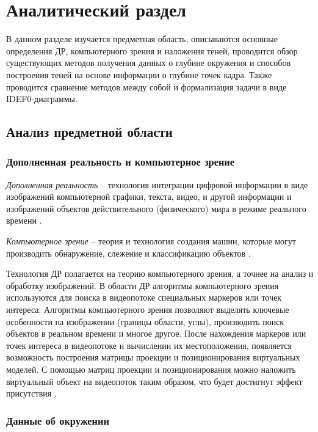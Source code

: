 \chapter{Аналитический раздел}

В данном разделе изучается предметная область, описываются основные определения ДР, компьютерного зрения и наложения теней, проводится обзор существующих методов получения данных о глубине окружения и способов построения теней на основе информации о глубине точек кадра. Также проводится сравнение методов между собой и формализация задачи в виде IDEF0-диаграммы.

\section{Анализ предметной области}

\subsection*{Дополненная реальность и компьютерное зрение}

\textit{Дополненная реальность} -- технология интеграции цифровой информации в виде изображений компьютерной графики, текста, видео, и другой информации и изображений объектов действительного (физического) мира в режиме реального времени \cite{tech-ar}.

\textit{Компьютерное зрение} -- теория и технология создания машин, которые могут производить обнаружение, слежение и классификацию объектов \cite{comp_vision}. 

Технология ДР полагается на теорию компьютерного зрения, а точнее на анализ и обработку изображений. В области
ДР алгоритмы компьютерного зрения используются для поиска в видеопотоке специальных маркеров или точек интереса. Алгоритмы компьютерного зрения позволяют выделять ключевые особенности на изображении (границы области, углы), производить поиск объектов в реальном времени и многое другое. После нахождения маркеров или точек интереса в видеопотоке и вычислении их местоположения, появляется возможность построения матрицы проекции и позиционирования виртуальных моделей. С помощью матриц проекции и позиционирования можно наложить виртуальный объект на видеопоток таким образом, что будет достигнут эффект присутствия \cite{tech-ar}.

\subsection*{Данные об окружении}

